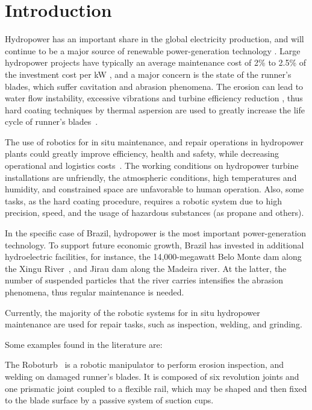\section{Introduction}

Hydropower has an important share in the global electricity production, and
will continue to be a major source of renewable power-generation technology
\cite{iea}. Large hydropower projects have typically an ave\-rage maintenance
cost of 2\% to 2.5\% of the investment cost per kW \cite{irena}, and a major
concern is the state of the runner's blades, which suffer cavitation and
abrasion phenomena. The erosion can lead to water flow instability, excessive
vibrations and turbine efficiency reduction \cite{goldemberg2007energia}, thus
hard coating techniques by thermal aspersion are used to greatly increase the
life cycle of runner's blades~\cite{krella2011new}.

The use of robotics for in situ maintenance, and repair operations in
hydropower plants could greatly improve efficiency, health and safety, while
decreasing operational and logistics costs~\cite{hazel2012field}. The working
conditions on hydropower turbine installations are unfriendly, the atmospheric
conditions, high temperatures and humidity, and constrained space are
unfavorable to human operation. Also, some tasks, as the hard coating
procedure, requires a robotic system due to high precision, speed, and the
usage of hazardous substances (as propane and others).

In the specific case of Brazil, hydropower is the most important
power-generation technology. To support future economic growth, Brazil has
invested in additional hydroelectric facilities, for instance, the
14,000-megawatt Belo Monte dam along the Xingu River~\cite{eia}, and Jirau dam
along the Madeira river. At the latter, the number of suspended particles that
the river carries intensifies the abrasion phenomena, thus regular maintenance
is needed.

Currently, the majority of the robotic systems for in situ hydropower
maintenance are used for repair tasks, such as inspection, welding, and
grinding. 

Some examples found in the literature are:

The Roboturb~\cite{roboturb} is a robotic manipulator to perform erosion
inspection, and welding on damaged runner's blades. It is composed of six
revolution joints and one prismatic joint coupled to a flexible rail, which may
be shaped and then fixed to the blade surface by a passive system of suction cups.

